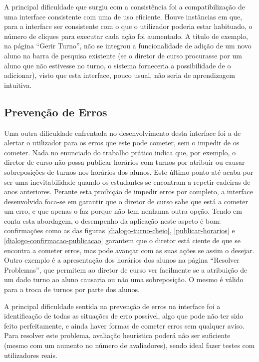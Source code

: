 \documentclass[12pt, a4paper]{article}
\begin{document}
A principal dificuldade que surgiu com a consistência foi a compatibilização de uma interface
consistente com uma de uso eficiente. Houve instâncias em que, para a interface ser consistente com
o que o utilizador poderia estar habituado, o número de cliques para executar cada ação foi
aumentado. A título de exemplo, na página ``Gerir Turno'', não se integrou a funcionalidade de
adição de um novo aluno na barra de pesquisa existente (se o diretor de curso procurasse por um
aluno que não estivesse no turno, o sistema forneceria a possibilidade de o adicionar), visto que
esta interface, pouco usual, não seria de aprendizagem intuitiva.

\subsection{Prevenção de Erros}

Uma outra dificuldade enfrentada no desenvolvimento desta interface foi a de alertar o utilizador
para os erros que este pode cometer, sem o impedir de os cometer. Nada no enunciado do trabalho
prático indica que, por exemplo, o diretor de curso não possa publicar horários com turnos por
atribuir ou causar sobreposições de turnos nos horários dos alunos. Este último ponto até acaba por
ser uma inevitabilidade quando os estudantes se encontram a repetir cadeiras de anos anteriores.
Perante esta proibição de impedir erros por completo, a interface desenvolvida foca-se em garantir
que o diretor de curso sabe que está a cometer um erro, e que apenas o faz porque não tem nenhuma
outra opção. Tendo em conta esta abordagem, o desempenho da aplicação neste aspeto é bom:
confirmações como as das figuras \ref{dialogo-turno-cheio}, \ref{publicar-horarios} e
\ref{dialogo-confirmacao-publicacao} garantem que o diretor está ciente de que se encontra a cometer
erros, mas pode avançar com as suas ações se assim o desejar. Outro exemplo é a apresentação dos
horários dos alunos na página ``Resolver Problemas'', que permitem ao diretor de curso ver
facilmente se a atribuição de um dado turno ao aluno causaria ou não uma sobreposição. O mesmo é
válido para a troca de turnos por parte dos alunos.

A principal dificuldade sentida na prevenção de erros na interface foi a identificação de todas as
situações de erro possível, algo que pode não ter sido feito perfeitamente, e ainda haver formas
de cometer erros sem qualquer aviso. Para resolver este problema, avaliação heurística poderá não
ser suficiente (mesmo com um aumento no número de avaliadores), sendo ideal fazer testes com
utilizadores reais.
\end{document}
